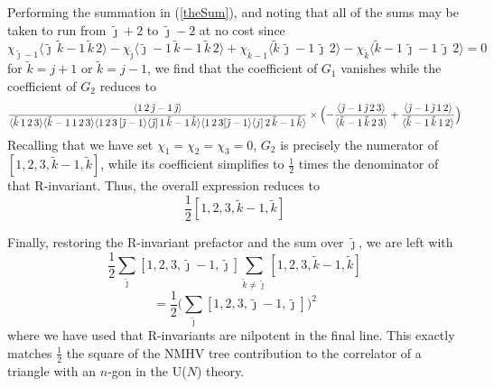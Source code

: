 \documentclass[12pt]{article}
\numberwithin{equation}{section}
\begin{document}
Performing the summation in (\ref{theSum}), and noting that all of the sums may be taken to run from \(\tilde{\jmath}+2\) to \(\tilde{\jmath}-2\) at no cost since
\begin{equation}
\chi_{\tilde{\jmath}-1}\langle \tilde{\jmath} \, \tilde{k}-1 \, \tilde{k} \, 2 \rangle - \chi_{\tilde{\jmath}} \langle \tilde{\jmath} - 1 \, \tilde{k}-1 \, \tilde{k} \, 2 \rangle + \chi_{\tilde{k}-1}\langle \tilde{k} \, \tilde{\jmath} -1 \, \tilde{\jmath}  \, 2 \rangle - \chi_{\tilde{k}} \langle \tilde{k}-1 \, \tilde{\jmath}-1 \, \tilde{\jmath} \, 2 \rangle = 0 
\end{equation}
for \(\tilde{k}=j+1\) or \(\tilde{k}=j-1\), we find that the coefficient of \(G_1\) vanishes while the coefficient of \(G_2\) reduces to 
\begin{equation}
\frac{\langle 1 \, 2 \, \tilde{\jmath}-1 \, \tilde{\jmath} \rangle}{\langle \tilde{k} \, 1 \, 2 \, 3 \rangle \langle \tilde{k} -1 \, 1 \, 2 \, 3 \rangle \langle 1 \, 2 \, 3 \, [\tilde{\jmath}-1 \rangle \langle \tilde{\jmath}] \, 1 \, \tilde{k}-1 \, \tilde{k} \rangle \langle 1 \, 2 \, 3 [ \tilde{\jmath}-1 \rangle \langle j] \, 2 \, \tilde{k}-1 \, \tilde{k} \rangle} \times \Bigl( -\frac{\langle \tilde{\jmath}-1 \, \tilde{\jmath} \, 2 \, 3 \rangle}{\langle \tilde{k}-1 \, \tilde{k} \, 2 \, 3 \rangle}  + \frac{\langle \tilde{\jmath}-1 \, \tilde{\jmath} \, 1 \, 2 \rangle}{\langle \tilde{k}-1 \, \tilde{k} \, 1 \, 2 \rangle} \Bigr)
\end{equation}
Recalling that we have set \(\chi_1=\chi_2=\chi_3 = 0\), \(G_2\) is precisely the numerator of \([1,2,3,\tilde{k}-1,\tilde{k}]\), while its coefficient simplifies to \(\frac{1}{2}\) times the denominator of that R-invariant. Thus, the overall expression reduces to 
\begin{equation}
\frac{1}{2}[1,2,3,\tilde{k}-1,\tilde{k}] 
\end{equation}

Finally, restoring the R-invariant prefactor and the sum over \(\tilde{\jmath}\), we are left with
\begin{equation}
\frac{1}{2}\sum_{\tilde{\jmath}}[1,2,3,\tilde{\jmath}-1,\tilde{\jmath}]\sum_{\tilde{k} \neq \tilde{\jmath}}[1,2,3,\tilde{k}-1,\tilde{k}]
\end{equation}
\begin{equation}
= \frac{1}{2}\bigl(\sum_{\tilde{\jmath}}[1,2,3,\tilde{\jmath}-1,\tilde{\jmath}]\bigr)^2
\end{equation}
where we have used that R-invariants are nilpotent in the final line. This exactly matches \(\frac{1}{2}\) the square of the NMHV tree contribution to the correlator of a triangle with an \(n\)-gon in the U($N$) theory.
\end{document}
